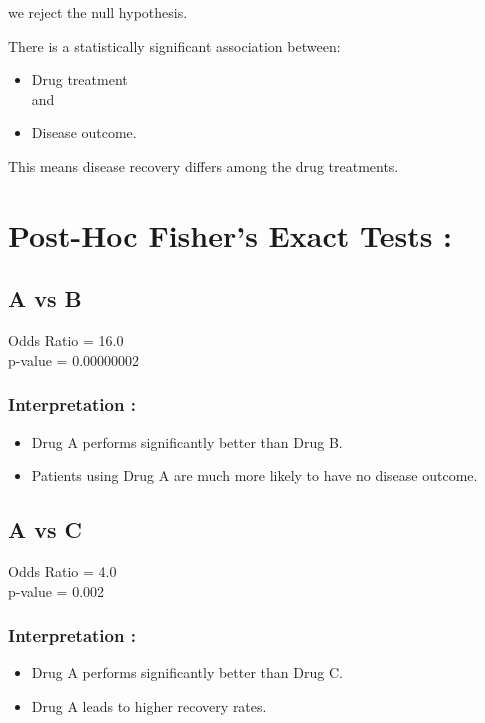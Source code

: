 \documentclass[
]{article}
\begin{document}
we reject the null hypothesis.

There is a statistically significant association between:

\begin{itemize}
\item
  Drug treatment\\
  and
\item
  Disease outcome.
\end{itemize}

This means disease recovery differs among the drug treatments.

\section{Post-Hoc Fisher's Exact Tests
:}\label{post-hoc-fishers-exact-tests}

\subsection{A vs B}\label{a-vs-b}

Odds Ratio = 16.0\\
p-value = 0.00000002

\subsubsection{Interpretation :}\label{interpretation-12}

\begin{itemize}
\item
  Drug A performs significantly better than Drug B.
\item
  Patients using Drug A are much more likely to have no disease outcome.
\end{itemize}

\subsection{A vs C}\label{a-vs-c}

Odds Ratio = 4.0\\
p-value = 0.002

\subsubsection{Interpretation :}\label{interpretation-13}

\begin{itemize}
\item
  Drug A performs significantly better than Drug C.
\item
  Drug A leads to higher recovery rates.
\end{itemize}
\end{document}
